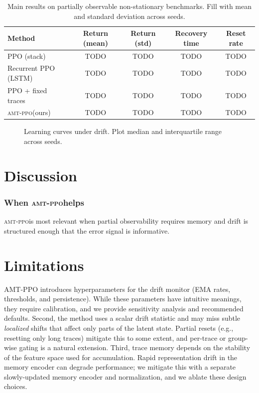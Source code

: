 \documentclass{article}
\newcommand{\AMT}{\textsc{amt-ppo}}
\begin{document}
\begin{table}[t]
\caption{Main results on partially observable non-stationary benchmarks. Fill with mean and standard deviation across seeds.}
\label{tab:main}
\centering
\small
\begin{tabular}{lcccc}
\toprule
Method & Return (mean) & Return (std) & Recovery time & Reset rate \\
\midrule
PPO (stack) & TODO & TODO & TODO & TODO \\
Recurrent PPO (LSTM) & TODO & TODO & TODO & TODO \\
PPO + fixed traces & TODO & TODO & TODO & TODO \\
\AMT (ours) & TODO & TODO & TODO & TODO \\
\bottomrule
\end{tabular}
\end{table}

\begin{figure}[t]
\centering
{}
\caption{Learning curves under drift. Plot median and interquartile range across seeds.}
\label{fig:curves}
\end{figure}

\section{Discussion}
\subsubsection*{When \AMT helps}
\AMT is most relevant when partial observability requires memory and drift is structured enough that the error signal is informative.

\section{Limitations}
AMT-PPO introduces hyperparameters for the drift monitor (EMA rates, thresholds, and persistence). While these parameters have intuitive meanings, they require calibration, and we provide sensitivity analysis and recommended defaults.
Second, the method uses a scalar drift statistic and may miss subtle \emph{localized} shifts that affect only parts of the latent state. Partial resets (e.g., resetting only long traces) mitigate this to some extent, and per-trace or group-wise gating is a natural extension.
Third, trace memory depends on the stability of the feature space used for accumulation. Rapid representation drift in the memory encoder can degrade performance; we mitigate this with a separate slowly-updated memory encoder and normalization, and we ablate these design choices.
\end{document}
